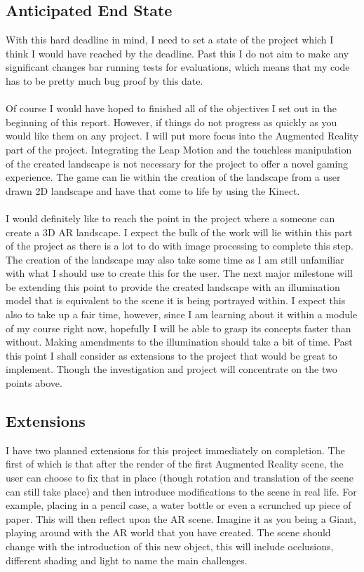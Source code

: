 \documentclass[11pt]{report}
\begin{document}
\subsection*{Anticipated End State}
With this hard deadline in mind, I need to set a state of the project which I think
I would have reached by the deadline. Past this I do not aim to make any significant
changes bar running tests for evaluations, which means that my code has to be 
pretty much bug proof by this date.
\\ \\
Of course I would have hoped to finished all of the objectives I set out in the 
beginning of this report. However, if things do not progress as quickly as you
would like them on any project. I will put more focus into the Augmented Reality
part of the project. Integrating the Leap Motion and the touchless manipulation
of the created landscape is not necessary for the project to offer a novel gaming
experience. The game can lie within the creation of the landscape from a user
drawn 2D landscape and have that come to life by using the Kinect. 
\\ \\
I would definitely like to reach the point in the project where a someone can
create a 3D AR landscape. I expect the bulk of the work will lie within this 
part of the project as there is a lot to do with image processing to complete
this step. The creation of the landscape may also take some time as I am still
unfamiliar with what I should use to create this for the user. 
The next major milestone will be extending this point to provide the created 
landscape with an illumination model that is equivalent to the scene it is being
portrayed within. I expect this also to take up a fair time, however, since
I am learning about it within a module of my course right now, hopefully I 
will be able to grasp its concepts faster than without. Making amendments to the
illumination should take a bit of time. Past this point I shall consider as 
extensions to the project that would be great to implement. Though the 
investigation and project will concentrate on the two points above.

\subsection*{Extensions}
I have two planned extensions for this project immediately on completion. 
The first of which is that after the render of the first Augmented
Reality scene, the user can choose to fix that in place (though rotation and
translation of the scene can still take place) and then introduce 
modifications to the scene in real life. For example, placing in a pencil case,
a water bottle or even a scrunched up piece of paper. This will then reflect 
upon the AR scene. Imagine it as you being a Giant, playing around with the
AR world that you have created. The scene should change with the introduction
of this new object, this will include occlusions, different shading and light to
name the main challenges.
\end{document}

